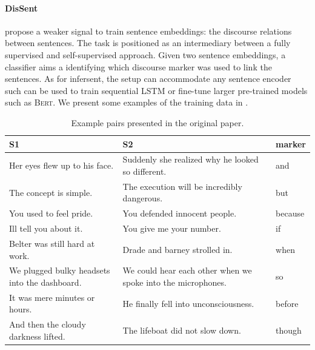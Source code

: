 




\paragraph{DisSent} \textcite{nie_19} propose a weaker signal to train sentence embeddings: the discourse relations between sentences. The task is positioned as an intermediary between a fully supervised and self-supervised approach. Given two sentence embeddings, a classifier aims a identifying which discourse marker was used to link the sentences. As for infersent, the setup can accommodate any sentence encoder such can be used to train sequential LSTM or fine-tune larger pre-trained models such as \textsc{Bert}. We present some examples of the training data in .

\begin{table}[!htb]
\centering
\small
\begin{tabularx}{\textwidth}{@{}YYY@{}}
\toprule
S1  & S2  & marker\\
\midrule
\midrule 
Her eyes flew up to his face.
&Suddenly she realized why he looked so different.&
and\\
The concept is simple.
&The execution will be incredibly dangerous.&
but \\
You used to feel pride.
&You defended innocent people.&
because \\
Ill tell you about it.
&You give me your number.&
if \\
Belter was still hard at work.
&Drade and barney strolled in.&
when \\
We plugged bulky headsets into the dashboard.
&We could hear each other when we spoke into the microphones.&
so \\
It was mere minutes or hours.
&He finally fell into unconsciousness.&
before \\
And then the cloudy darkness lifted.
&The lifeboat did not slow down.&
though \\
\bottomrule
\end{tabularx}
\caption{Example pairs presented in the original paper.}
\end{table}

